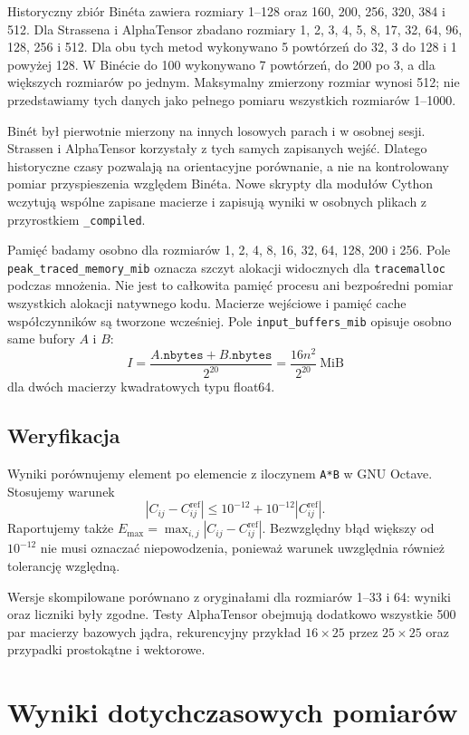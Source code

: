 \documentclass[11pt,a4paper]{article}
\begin{document}
Historyczny zbiór Binéta zawiera rozmiary 1--128 oraz
160, 200, 256, 320, 384 i 512. Dla Strassena i AlphaTensor zbadano
rozmiary 1, 2, 3, 4, 5, 8, 17, 32, 64, 96, 128, 256 i 512.
Dla obu tych metod wykonywano 5 powtórzeń do 32, 3 do 128 i 1 powyżej 128.
W Binécie do 100 wykonywano 7 powtórzeń, do 200 po 3,
a dla większych rozmiarów po jednym.
Maksymalny zmierzony rozmiar wynosi 512; nie przedstawiamy
tych danych jako pełnego pomiaru wszystkich rozmiarów 1--1000.

Binét był pierwotnie mierzony na innych losowych parach i w osobnej sesji.
Strassen i AlphaTensor korzystały z tych samych zapisanych wejść.
Dlatego historyczne czasy pozwalają na orientacyjne porównanie,
a nie na kontrolowany pomiar przyspieszenia względem Binéta.
Nowe skrypty dla modułów Cython wczytują wspólne zapisane macierze
i zapisują wyniki w osobnych plikach z przyrostkiem \texttt{\_compiled}.

Pamięć badamy osobno dla rozmiarów
1, 2, 4, 8, 16, 32, 64, 128, 200 i 256.
Pole \texttt{peak\_traced\_memory\_mib} oznacza szczyt alokacji widocznych
dla \texttt{tracemalloc} podczas mnożenia. Nie jest to całkowita pamięć
procesu ani bezpośredni pomiar wszystkich alokacji natywnego kodu.
Macierze wejściowe i pamięć cache współczynników są tworzone wcześniej.
Pole \texttt{input\_buffers\_mib} opisuje osobno same bufory $A$ i $B$:
\[
 I=\frac{A.\texttt{nbytes}+B.\texttt{nbytes}}{2^{20}}
   =\frac{16n^2}{2^{20}}\ \text{MiB}
\]
dla dwóch macierzy kwadratowych typu float64.

\subsection{Weryfikacja}
Wyniki porównujemy element po elemencie z iloczynem \texttt{A*B}
w GNU Octave. Stosujemy warunek
\[
 |C_{ij}-C^{\mathrm{ref}}_{ij}|
 \le 10^{-12}+10^{-12}|C^{\mathrm{ref}}_{ij}|.
\]
Raportujemy także $E_{\max}=\max_{i,j}|C_{ij}-C^{\mathrm{ref}}_{ij}|$.
Bezwzględny błąd większy od $10^{-12}$ nie musi oznaczać niepowodzenia,
ponieważ warunek uwzględnia również tolerancję względną.

Wersje skompilowane porównano z oryginałami dla rozmiarów 1--33 i 64:
wyniki oraz liczniki były zgodne. Testy AlphaTensor obejmują dodatkowo
wszystkie 500 par macierzy bazowych jądra, rekurencyjny przykład
$16\times25$ przez $25\times25$ oraz przypadki prostokątne i wektorowe.

\section{Wyniki dotychczasowych pomiarów}
\end{document}
